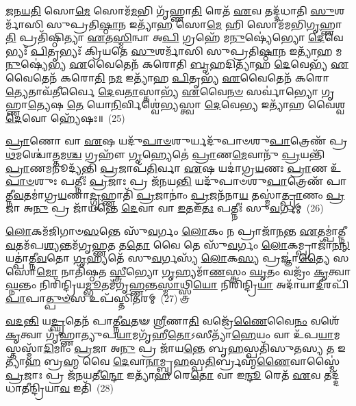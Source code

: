 \-\ul{𑌜}\-\-\ul{𑌨}\-\-\ul{𑌯}\-\-\ul{𑌤𑌿} 𑌸𑍋\-\ul{𑌮𑍇} 𑌸𑍋𑌮᳴\-\ul{𑌮}\-𑌭𑌿 𑌗𑍃᳴𑌹𑍍𑌣𑌾\-\ul{𑌤𑌿} 𑌰𑍇𑌤᳴ \ul{𑌏}\-𑌵 𑌤𑌦𑍍𑌦᳴𑌧𑌾𑌤𑌿 \ul{𑌸𑍁}\-𑌶𑌰𑍍𑌮𑌾᳴𑌸𑌿 𑌸𑍁𑌪𑍍𑌰𑌤𑌿\-\ul{𑌷𑍍𑌠𑌾}\-𑌨 𑌇𑌤𑍍𑌯𑌾᳴\-\ul{𑌹} 𑌸𑍋\-\ul{𑌮𑍇} 𑌹𑌿 𑌸𑍋𑌮᳴𑌮𑌭𑌿\-\ul{𑌗𑍃}\-𑌹𑍍𑌣𑌾\-\ul{𑌤𑌿} 𑌪𑍍𑌰𑌤𑌿᳴𑌷𑍍𑌠𑌿𑌤𑍍𑌯𑌾 \ul{𑌏}\-𑌤\-\ul{𑌸𑍍𑌮𑌿}\-𑌨𑍍𑌵𑌾 𑌅\-\ul{𑌪𑌿} 𑌗𑍍𑌰𑌹𑍇᳴ 𑌮\-\ul{𑌨𑍁}\-𑌷𑍍𑌯𑍇॑𑌭𑍍𑌯𑍋 \ul{𑌦𑍇}\-𑌵𑍇𑌭𑍍𑌯𑌃᳴ \ul{𑌪𑌿}\-𑌤𑍃𑌭𑍍𑌯𑌃᳴ 𑌕𑍍𑌰𑌿𑌯𑌤𑍇 \ul{𑌸𑍁}\-𑌶𑌰𑍍𑌮𑌾᳴𑌸𑌿 𑌸𑍁𑌪𑍍𑌰𑌤𑌿\-\ul{𑌷𑍍𑌠𑌾}\-𑌨 𑌇𑌤𑍍𑌯𑌾᳴𑌹 𑌮\-\ul{𑌨𑍁}\-𑌷𑍍𑌯𑍇॑𑌭𑍍𑌯 \ul{𑌏}\-𑌵𑍈𑌤𑍇𑌨᳴ 𑌕𑌰𑍋𑌤𑌿 \ul{𑌬𑍃}\-𑌹𑌦𑌿𑌤𑍍𑌯𑌾᳴𑌹 \ul{𑌦𑍇}\-𑌵𑍇𑌭𑍍𑌯᳴ \ul{𑌏}\-𑌵𑍈𑌤𑍇𑌨᳴ 𑌕𑌰𑍋\-\ul{𑌤𑌿} 𑌨\-\ul{𑌮} 𑌇𑌤𑍍𑌯𑌾᳴𑌹 \ul{𑌪𑌿}\-𑌤𑍃𑌭𑍍𑌯᳴ \ul{𑌏}\-𑌵𑍈𑌤𑍇𑌨᳴ 𑌕𑌰𑍋\-\ul{𑌤𑍍𑌯𑍇}\-𑌤𑌾𑌵᳴\-\ul{𑌤𑍀}\-𑌰𑍍𑌵𑍈 \ul{𑌦𑍇}\-𑌵\-\ul{𑌤𑌾}\-𑌸𑍍𑌤𑌾𑌭𑍍𑌯᳴ \ul{𑌏}\-𑌵𑍈\-\ul{𑌨}\-\-\ul{𑍞} 𑌸𑌰𑍍𑌵𑌾॑𑌭𑍍𑌯𑍋 𑌗𑍃𑌹𑍍𑌣𑌾\-\ul{𑌤𑍍𑌯𑍇}\-𑌷 \ul{𑌤𑍇} 𑌯𑍋\-\ul{𑌨𑌿}\-𑌰𑍍𑌵𑌿𑌶𑍍𑌵𑍇॑𑌭𑍍𑌯𑌸𑍍𑌤𑍍𑌵𑌾 \ul{𑌦𑍇}\-𑌵𑍇\-\ul{𑌭𑍍𑌯} 𑌇𑌤𑍍𑌯𑌾᳴𑌹 𑌵𑍈𑌶𑍍𑌵\-\ul{𑌦𑍇}\-𑌵𑍋 𑌹𑍍𑌯𑍇᳴𑌷𑌃॥~(25)

{\anuvakamend[{𑌵𑌿\-\ul{𑌶𑍍𑌵𑍇} 𑌪𑍍𑌰 \ul{𑌪𑌿}\-𑌤𑍃𑌭𑍍𑌯᳴ \ul{𑌏}\-𑌵𑍈𑌤𑍇𑌨᳴ 𑌕\-\ul{𑌰𑍋}\-𑌤𑍍𑌯𑍇\-\ul{𑌕𑌾}\-𑌨𑍍𑌨𑌵𑌿𑍞᳴\-\ul{𑌶}\-𑌤𑌿𑌶𑍍𑌚᳴}]}%

\-\ul{𑌪𑍍𑌰𑌾}\-𑌣𑍋 𑌵𑌾 \ul{𑌏}\-𑌷 𑌯𑌦𑍁᳴\-\ul{𑌪𑌾}\-\-\ul{𑍞}\-𑌶𑍁𑌰𑍍𑌯𑌦𑍁᳴𑌪𑌾𑍞𑌶𑍁\-\ul{𑌪𑌾}\-𑌤𑍍𑌰𑍇𑌣᳴ 𑌪𑍍𑌰\-\ul{𑌥}\-𑌮𑌶𑍍𑌚𑍋॑\-\ul{𑌤𑍍𑌤}\-𑌮\-\ul{𑌶𑍍𑌚} 𑌗𑍍𑌰𑌹𑍗᳴ \ul{𑌗𑍃}\-𑌹𑍍𑌯𑍇𑌤𑍇॑ \ul{𑌪𑍍𑌰𑌾}\-𑌣\-\ul{𑌮𑍇}\-𑌵𑌾𑌨𑍁᳴ \ul{𑌪𑍍𑌰}\-𑌯𑌨𑍍𑌤𑌿᳴ \ul{𑌪𑍍𑌰𑌾}\-𑌣𑌮𑌨𑍂𑌦𑍍𑌯᳴𑌨𑍍𑌤𑌿 \ul{𑌪𑍍𑌰}\-𑌜𑌾𑌪᳴\-\ul{𑌤𑌿}\-𑌰𑍍𑌵𑌾 \ul{𑌏}\-𑌷 𑌯𑌦𑌾॑𑌗𑍍𑌰\-\ul{𑌯}\-𑌣𑌃 \ul{𑌪𑍍𑌰𑌾}\-𑌣 𑌉᳴\-\ul{𑌪𑌾}\-\-\ul{𑍞}\-𑌶𑍁𑌃 𑌪𑌤𑍍𑌨𑍀𑌃॑ \ul{𑌪𑍍𑌰}\-𑌜𑌾𑌃 𑌪𑍍𑌰 𑌜᳴𑌨𑌯\-\ul{𑌨𑍍𑌤𑌿} 𑌯𑌦𑍁᳴𑌪𑌾𑍞𑌶𑍁\-\ul{𑌪𑌾}\-𑌤𑍍𑌰𑍇𑌣᳴ 𑌪𑌾𑌤𑍍𑌨𑍀\-\ul{𑌵}\-𑌤𑌮𑌾॑𑌗𑍍𑌰\-\ul{𑌯}\-𑌣𑌾\-\ul{𑌦𑍍𑌗𑍃}\-𑌹𑍍𑌣𑌾𑌤𑌿᳴ \ul{𑌪𑍍𑌰}\-𑌜𑌾𑌨𑌾𑌂॑ \ul{𑌪𑍍𑌰}\-𑌜𑌨᳴𑌨𑌾\-\ul{𑌯} 𑌤𑌸𑍍𑌮𑌾॑\-\ul{𑌤𑍍𑌪𑍍𑌰𑌾}\-𑌣𑌂 \ul{𑌪𑍍𑌰}\-𑌜𑌾 𑌅\-\ul{𑌨𑍁} 𑌪𑍍𑌰 𑌜𑌾᳴𑌯𑌨𑍍𑌤𑍇 \ul{𑌦𑍇}\-𑌵𑌾 𑌵𑌾 \ul{𑌇}\-𑌤𑌇᳴\-\ul{𑌤𑌃} 𑌪𑌤𑍍𑌨𑍀𑌃॑ 𑌸𑍁\-\ul{𑌵}\-𑌰𑍍𑌗𑌮𑍍~(26)

\-\ul{𑌲𑍋}\-𑌕𑌮᳴𑌜𑌿𑌗𑌾𑍞\-\ul{𑌸}\-𑌨𑍍𑌤𑍇 𑌸𑍁᳴\-\ul{𑌵}\-𑌰𑍍𑌗𑌂 \ul{𑌲𑍋}\-𑌕𑌂 𑌨 𑌪𑍍𑌰𑌾𑌜𑌾᳴\-\ul{𑌨}\-𑌨𑍍𑌤 \ul{𑌏}\-𑌤𑌮𑍍𑌪𑌾॑𑌤𑍍𑌨𑍀\-\ul{𑌵}\-𑌤𑌮᳴𑌪\-\ul{𑌶𑍍𑌯}\-𑌨𑍍𑌤𑌮᳴𑌗𑍃𑌹𑍍𑌣\-\ul{𑌤} 𑌤\-\ul{𑌤𑍋} 𑌵𑍈 𑌤𑍇 𑌸𑍁᳴\-\ul{𑌵}\-𑌰𑍍𑌗𑌂 \ul{𑌲𑍋}\-𑌕𑌮𑍍𑌪𑍍𑌰𑌾𑌜𑌾᳴\-\ul{𑌨}\-\-\ul{𑌨𑍍} 𑌯𑌤𑍍𑌪𑌾॑𑌤𑍍𑌨𑍀\-\ul{𑌵}\-𑌤𑍋 \ul{𑌗𑍃}\-𑌹𑍍𑌯𑌤𑍇᳴ 𑌸𑍁\-\ul{𑌵}\-𑌰𑍍𑌗𑌸𑍍𑌯᳴ \ul{𑌲𑍋}\-𑌕\-\ul{𑌸𑍍𑌯} 𑌪𑍍𑌰𑌜𑍍𑌞𑌾॑\-\ul{𑌤𑍍𑌯𑍈} 𑌸 𑌸𑍋\-\ul{𑌮𑍋} 𑌨𑌾𑌤𑌿᳴𑌷𑍍𑌠𑌤 \ul{𑌸𑍍𑌤𑍍𑌰𑍀}\-𑌭𑍍𑌯𑍋 \ul{𑌗𑍃}\-𑌹𑍍𑌯𑌮𑌾᳴\-\ul{𑌣}\-𑌸𑍍𑌤𑌂 \ul{𑌘𑍃}\-𑌤𑌂 𑌵𑌜𑍍𑌰𑌂᳴ \ul{𑌕𑍃}\-𑌤𑍍𑌵𑌾\-\ul{𑌘𑍍𑌨}\-𑌨𑍍𑌤𑌂 𑌨𑌿𑌰𑌿᳴𑌨𑍍𑌦𑍍𑌰𑌿𑌯\-\ul{𑌮𑍍𑌭𑍂}\-𑌤𑌮᳴𑌗𑍃\-\ul{𑌹𑍍𑌣}\-𑌨𑍍𑌤\-\ul{𑌸𑍍𑌮𑌾}\-𑌥𑍍𑌸𑍍𑌤𑍍𑌰𑌿\-\ul{𑌯𑍋} 𑌨𑌿𑌰𑌿᳴𑌨𑍍𑌦𑍍𑌰𑌿\-\ul{𑌯𑌾} 𑌅𑌦𑌾᳴𑌯𑌾\-\ul{𑌦𑍀}\-𑌰𑌪𑌿᳴ \ul{𑌪𑌾}\-𑌪𑌾\-\ul{𑌤𑍍𑌪𑍁}\-\-\ul{𑍞}\-𑌸 𑌉𑌪᳴𑌸𑍍𑌤𑌿𑌤𑌰𑌮𑍍~(27)

\-\ul{𑌵}\-\-\ul{𑌦}\-\-\ul{𑌨𑍍𑌤𑌿} 𑌯\-\ul{𑌦𑍍𑌘𑍃}\-𑌤𑍇𑌨᳴ 𑌪𑌾𑌤𑍍𑌨𑍀\-\ul{𑌵}\-𑌤𑍟 \ul{𑌶𑍍𑌰𑍀}\-𑌣𑌾\-\ul{𑌤𑌿} 𑌵𑌜𑍍𑌰𑍇᳴\-\ul{𑌣𑍈}\-𑌵𑍈\-\ul{𑌨𑌂} 𑌵𑌶𑍇᳴ \ul{𑌕𑍃}\-𑌤𑍍𑌵𑌾 𑌗𑍃᳴𑌹𑍍𑌣𑌾𑌤𑍍𑌯𑍁𑌪\-\ul{𑌯𑌾}\-𑌮𑌗𑍃᳴𑌹𑍀\-\ul{𑌤𑍋}\-\-𑌽𑌸𑍀𑌤𑍍𑌯𑌾᳴\-\ul{𑌹𑍇}\-𑌯𑌂 𑌵𑌾 𑌉᳴𑌪\-\ul{𑌯𑌾}\-𑌮𑌸𑍍𑌤𑌸𑍍𑌮𑌾᳴\-\ul{𑌦𑌿}\-𑌮𑌾𑌂 \ul{𑌪𑍍𑌰}\-𑌜𑌾 𑌅\-\ul{𑌨𑍁} 𑌪𑍍𑌰 𑌜𑌾᳴𑌯\-\ul{𑌨𑍍𑌤𑍇} 𑌬𑍃\-\ul{𑌹}\-𑌸𑍍𑌪𑌤𑌿᳴𑌸𑍁𑌤𑌸𑍍𑌯 \ul{𑌤} 𑌇𑌤𑍍𑌯𑌾᳴\-\ul{𑌹} 𑌬𑍍𑌰\-\ul{𑌹𑍍𑌮} 𑌵𑍈 \ul{𑌦𑍇}\-𑌵𑌾\-\ul{𑌨𑌾}\-𑌮𑍍𑌬𑍃\-\ul{𑌹}\-𑌸𑍍𑌪\-\ul{𑌤𑌿}\-𑌰𑍍𑌬𑍍𑌰𑌹𑍍𑌮᳴\-\ul{𑌣𑍈}\-𑌵𑌾𑌸𑍍𑌮𑍈॑ \ul{𑌪𑍍𑌰}\-𑌜𑌾𑌃 𑌪𑍍𑌰 𑌜᳴𑌨𑌯𑌤𑍀\-\ul{𑌨𑍍𑌦𑍋} 𑌇𑌤𑍍𑌯𑌾᳴\-\ul{𑌹} 𑌰𑍇\-\ul{𑌤𑍋} 𑌵𑌾 𑌇\-\ul{𑌨𑍍𑌦𑍂} 𑌰𑍇𑌤᳴ \ul{𑌏}\-𑌵 𑌤𑌦𑍍𑌦᳴𑌧𑌾𑌤𑍀𑌨𑍍𑌦𑍍𑌰𑌿𑌯𑌾\-\ul{𑌵} 𑌇𑌤𑌿᳴~(28)


